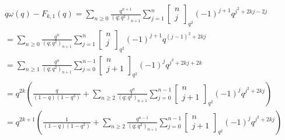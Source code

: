 \documentclass[12pt,reqno]{amsart}
\renewcommand{\(}{\left\(}
\renewcommand{\)}{\right\)}
\newcommand{\os}[2]{\overset{#1}{#2}}
\numberwithin{equation}{section}
\theoremstyle{plain}
\theoremstyle{definition}
\numberwithin{equation}{section}
\begin{document}
\begin{align*}
&q\omega(q)-F_{k,1}(q)=\sum_{n\ge 0}\frac{q^{n+1}}{\left(q;q^2\right)_{n+1}}\sum_{j=1}^{n}\begin{bmatrix}
n\\
j
\end{bmatrix}_{q^2}(-1)^{j+1} q^{j^2+2kj-2j}\nonumber\\
&=\sum_{n\ge 0}\frac{q^{n}}{\left(q;q^2\right)_{n+1}}\sum_{j=1}^{n}\begin{bmatrix}
n\\
j
\end{bmatrix}_{q^2}(-1)^{j+1} q^{\left(j-1\right)^2+2kj}\nonumber\\
&
=\sum_{n\ge 1}\frac{q^{n}}{\left(q;q^2\right)_{n+1}}\sum_{j=0}^{n-1}\begin{bmatrix}
n\\
j+1
\end{bmatrix}_{q^2}(-1)^{j} q^{j^2+2kj+2k}\nonumber\\
&=q^{2k}\left(\frac{q}{\left(1-q\right)\left(1-q^3\right)}+\sum_{n\ge 2}\frac{q^{n}}{\left(q;q^2\right)_{n+1}}\sum_{j=0}^{n-1}\begin{bmatrix}
n\\
j+1
\end{bmatrix}_{q^2}(-1)^{j} q^{j^2+2kj}\right)\nonumber\\
&=q^{2k+1}\left(\frac{1}{\left(1-q\right)\left(1-q^3\right)}+\sum_{n\ge 2}\frac{q^{n-1}}{\left(q;q^2\right)_{n+1}}\sum_{j=0}^{n-1}\begin{bmatrix}
n\\
j+1
\end{bmatrix}_{q^2}(-1)^{j} q^{j^2+2kj}\right)\nonumber\\

\end{align*}
\end{document}
